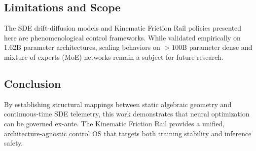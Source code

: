 \documentclass[11pt]{article}
\begin{document}
\subsection{Limitations and Scope}
The SDE drift-diffusion models and Kinematic Friction Rail policies presented here are phenomenological control frameworks. While validated empirically on 1.62B parameter architectures, scaling behaviors on $>100\text{B}$ parameter dense and mixture-of-experts (MoE) networks remain a subject for future research.

\subsection{Conclusion}
By establishing structural mappings between static algebraic geometry and continuous-time SDE telemetry, this work demonstrates that neural optimization can be governed ex-ante. The Kinematic Friction Rail provides a unified, architecture-agnostic control OS that targets both training stability and inference safety.
\end{document}
